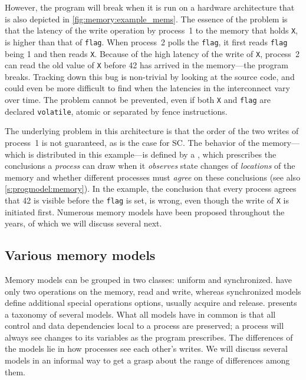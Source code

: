 However, the program will break when it is run on a hardware architecture that is also depicted in \cref{fig:memory:example_mems}.
The essence of the problem is that the latency of the write operation by process~1 to the memory that holds \lstinline|X|, is higher than that of \lstinline|flag|.
When process~2 polls the \lstinline|flag|, it first reads \lstinline|flag| being 1 and then reads \lstinline|X|.
Because of the high latency of the write of \lstinline|X|, process~2 can read the old value of \lstinline|X| before 42 has arrived in the memory---the program breaks.
Tracking down this bug is non-trivial by looking at the source code, and could even be more difficult to find when the latencies in the interconnect vary over time.
The problem cannot be prevented, even if both \lstinline|X| and \lstinline|flag| are declared \lstinline|volatile|, atomic or separated by fence instructions.

The underlying problem in this architecture is that the order of the two writes of process~1 is not guaranteed, as is the case for \acl{SC}.
The behavior of the memory---which is distributed in this example---is defined by a , which prescribes the conclusions a \emph{process} can draw when it \emph{observes} state changes of \emph{locations} of the memory and whether different processes must \emph{agree} on these conclusions (see also \cref{s:progmodel:memory}).
In the example, the conclusion that every process agrees that 42 is visible before the \lstinline|flag| is set, is wrong, even though the write of \lstinline|X| is initiated first.
Numerous memory models have been proposed throughout the years, of which we will discuss several next.

\subsection{Various memory models}
\label{s:memory:related}

Memory models can be grouped in two classes: uniform and synchronized.
 have only two operations on the memory, read and write, whereas synchronized models define additional special operations options, usually acquire and release.
 presents a taxonomy of several models.
What all models have in common is that all control and data dependencies local to a process are preserved; a process will always see changes to its variables as the program prescribes.
The differences of the models lie in how processes see each other's writes.
We will discuss several models in an informal way to get a grasp about the range of differences among them.

